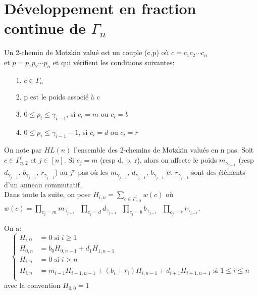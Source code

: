 \section{Développement en fraction continue de $\Gamma_{n}$}

\begin{definition}
	\begin{rm}
		Un 2-chemin de Motzkin valué est un couple (c,p) où $c = c_{1}c_{2}\cdots c_{n}$\\ et $p = p_{1}p_{2}\cdots p_{n}$ et qui
		vérifient les conditions suivantes:
		\begin{itemize}
			\item[1.] $c \in \Gamma_{n}$
			\item[2.] p est le poids associé à c
			\item[3.] $0\leq p_{i}\leq \gamma_{i-1}$, si $c_{i}=m\text{ ou }c_{i}=b$
			\item[4.]  $0\leq p_{i}\leq \gamma_{i-1} - 1$, si  $c_{i}=d\text{ ou }c_{i}=r$
		\end{itemize}
	\end{rm}
\end{definition}
On note par $HL(n)$ l'ensemble des 2-chemins de Motzkin valués en n pas.
Soit $c \in \Gamma_{n, 2}^{i}$ et $j \in [n]$. Si $c_{j} = m$ (resp d, b, r), alors on affecte le poids $m_{\gamma_{j-1}}$ (resp
$d_{\gamma_{j-1}}$, $b_{\gamma_{j-1}}$, $r_{\gamma_{j-1}}$) au $j^e$-pas où les  $m_{\gamma_{j-1}}$, $d_{\gamma_{j-1}}$,
$b_{\gamma_{j-1}}$ et  $r_{\gamma_{j-1}}$ sont des éléments d'un anneau commutatif.\vspace{10pt}\\
Dans toute la suite, on pose $H_{i,n} = \underset{c\in \Gamma_{n,2}^{i}}{\sum}w(c)$ où $w(c) = \underset{c_{j}=m}{\prod}
	m_{\gamma_{j-1}}\text{ } \underset{c_{j}=d}{\prod}d_{\gamma_{j-1}}\text{ }\underset{c_{j}=b}{\prod}
	b_{\gamma_{j-1}}\text{ }\underset{c_{j}=r}{\prod}r_{\gamma_{j-1}}$.\\
\begin{proposition} \label{weight-tab}
	On a:
	\[
		\begin{cases}
			H_{i,0} & =0 \text{ si }i\geq 1                                                                  \\
			H_{0,n} & =b_{0}H_{0,n-1}+d_{1}H_{1,n-1}                                                         \\
			H_{i,n} & =0 \text{ si } i>n                                                                     \\
			H_{i,n} & =m_{i-1}H_{i-1,n-1}+(b_{i}+r_{i})H_{i,n-1}+d_{i+1}H_{i+1,n-1} \text{ si }1\leq i\leq n \\
		\end{cases}
	\]
	avec la convention $H_{0,0}=1$
\end{proposition}

